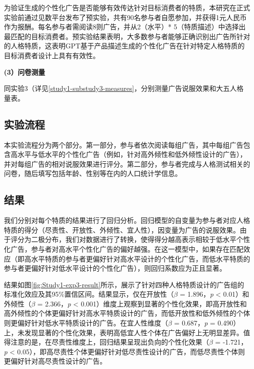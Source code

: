 为验证生成的个性化广告是否能够有效传达针对目标消费者的特质，本研究在正式实验前通过见数平台发布了预实验，共有90名参与者自愿参加，并获得1元人民币作为报酬。每名参与者需阅读8则广告，并从2（水平）* 5（特质描述）中选择出最匹配的目标消费者。预实验结果表明，大多数参与者能够正确识别出广告所针对的人格特质，这表明GPT基于产品描述生成的个性化广告在针对特定人格特质的目标消费者设计上具有有效性。


\textbf{(3）问卷测量}

同实验3（详见\ref{study1-substudy3-measures}，分别测量广告说服效果和大五人格量表。


\subsection{实验流程}
本实验流程分为两个部分。第一部分，参与者依次阅读每组广告，其中每组广告包含高水平与低水平的个性化广告（例如，针对高外倾性和低外倾性设计的广告），并对每组广告的相对说服效果进行评分。第二部分，参与者完成与人格测试相关的问卷，随后填写包括年龄、性别等在内的人口统计学信息。

\subsection{结果}
我们分别对每个特质的结果进行了回归分析。回归模型的自变量为参与者对应人格特质的得分（尽责性、开放性、外倾性、宜人性），因变量为广告的说服效果。由于评分为二极分布，我们对数据进行了转换，使得得分越高表示相较于低水平个性化广告，参与者对高水平个性化广告的偏好越强。在这一模型中，如果存在匹配效应（即高水平特质的参与者更偏好针对高水平设计的个性化广告，而低水平特质的参与者更偏好针对低水平设计的个性化广告），则回归系数应为正且显著。

结果如图\ref{fig:Study1-exp3-result}所示，展示了针对四种人格特质设计的广告组的标准化效应及其95\%置信区间。结果显示，仅在开放性（\textit{$\beta$} = 1.896，\textit{p} < 0.01）和外倾性（\textit{$\beta$} = 2.366，\textit{p} < 0.001）维度上观察到显著的个性化效果，即高开放性和高外倾性的个体更偏好针对高水平特质设计的广告，而低开放性和低外倾性的个体则更偏好针对低水平特质设计的广告。在宜人性维度（\textit{$\beta$} = 0.687，\textit{p} = 0.490）上，未发现显著的个性化效果，表明高低宜人性个体在广告偏好上无明显差异。值得注意的是，在尽责性维度上，回归结果呈现出负向的个性化效果（\textit{$\beta$} = -1.721，\textit{p} < 0.05），即高尽责性个体更偏好针对低尽责性设计的广告，而低尽责性个体则更偏好针对高尽责性设计的广告。

